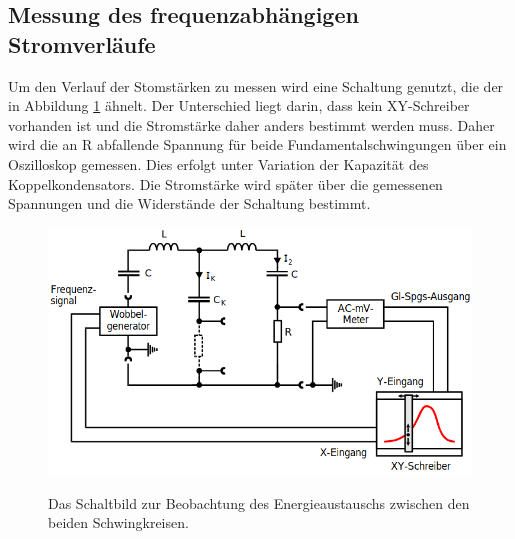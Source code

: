 \documentclass[titlepage = firstcover]{scrartcl}
\begin{document}
    \subsection{Messung des frequenzabhängigen Stromverläufe}
          Um den Verlauf der Stomstärken zu messen wird eine Schaltung genutzt, die der in Abbildung \ref{fig:Stromverlauf} ähnelt. Der Unterschied liegt darin, dass kein 
          XY-Schreiber vorhanden ist und die Stromstärke daher anders bestimmt werden muss. Daher wird die an R abfallende Spannung  für beide 
          Fundamentalschwingungen über ein Oszilloskop gemessen. Dies erfolgt unter Variation der Kapazität des Koppelkondensators. Die Stromstärke wird 
          später über die gemessenen Spannungen und die Widerstände der Schaltung bestimmt. 
          \begin{figure}[h]
            \centering
            \caption{Das Schaltbild zur Beobachtung des Energieaustauschs zwischen den beiden Schwingkreisen.}
            \includegraphics[width = 0.4\linewidth]{Stromverlauf.png}
            \label{fig:Stromverlauf}
          \end{figure}
\end{document}

